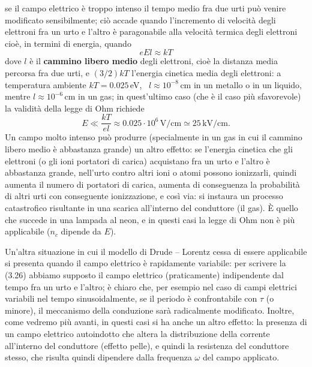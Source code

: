 se il campo elettrico \`e troppo intenso il tempo medio fra due urti pu\`o
venire modificato sensibilmente; ci\`o accade quando l'incremento di velocit\`a
degli elettroni fra un urto e l'altro \`e paragonabile alla velocit\`a termica
degli elettroni cio\`e, in termini di energia, quando
\begin{equation}
  eEl\approx kT
  \tag{3.31}
\end{equation}
dove $l$ \`e il \textbf{cammino libero medio} degli elettroni, cio\`e la
distanza media percorsa fra due urti, e $(3/2)kT$ l'energia cinetica media degli
elettroni: a temperatura ambiente $kT=0.025$\,eV, \ $l\approx10^{-8}$\,cm in un
metallo o in un liquido, mentre $l\approx10^{-6}$\,cm in un gas; in quest'ultimo
caso (che \`e il caso pi\`u sfavorevole) la validit\`a della legge di Ohm
richiede
\begin{equation}
  E\ll\frac{kT}{el}\approx0.025\cdot10^6\,\mathrm{V/cm}\simeq25\,\mathrm{kV/cm}.
  \tag{3.32}
\end{equation}
Un campo molto intenso pu\`o produrre (specialmente in un gas in cui il cammino
libero medio \`e abbastanza grande) un altro effetto: se l'energia cinetica che
gli elettroni (o gli ioni portatori di carica) acquistano fra un urto e l'altro
\`e abbastanza grande, nell'urto contro altri ioni o atomi possono ionizzarli,
quindi aumenta il numero di portatori di carica, aumenta di conseguenza la
probabilit\`a di altri urti con conseguente ionizzazione, e cos\`i via: si
instaura un processo catastrofico risultante in una scarica all'interno del
conduttore (il gas). \`E quello che succede in una lampada al neon, e in questi
casi la legge di Ohm non \`e pi\`u applicabile ($n_c$ dipende da $E$).

Un'altra situazione in cui il modello di Drude -- Lorentz cessa di essere
applicabile si presenta quando il campo elettrico \`e rapidamente variabile: per
scrivere la (3.26) abbiamo supposto il campo elettrico (praticamente)
indipendente dal tempo fra un urto e l'altro; \`e chiaro che, per esempio nel
caso di campi elettrici variabili nel tempo sinusoidalmente, se il periodo \`e
confrontabile con $\tau$ (o minore), il meccanismo della conduzione sar\`a
radicalmente modificato. Inoltre, come vedremo pi\`u avanti, in questi casi si
ha anche un altro effetto: la presenza di un campo elettrico autoindotto che
altera la distribuzione della corrente all'interno del conduttore (effetto
pelle), e quindi la resistenza del conduttore stesso, che risulta quindi
dipendere dalla frequenza $\omega$ del campo applicato.

